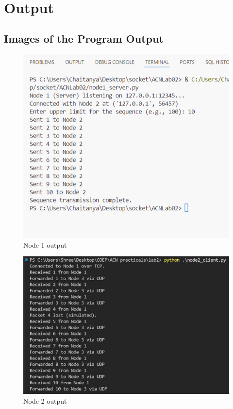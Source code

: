 \documentclass{article}
\begin{document}
\section{Output}


\subsection{Images of the Program Output}
\begin{figure}[htbp]
    \centering
    \includegraphics[]{node01.png}
    \caption{Node 1 output}
    \label{fig:node01}
\end{figure}

\begin{figure}[htbp]
    \centering
    \includegraphics[angle=90,width=14cm]{node02.png}
    \caption{Node 2 output}
    \label{fig:node02}
\end{figure}
\end{document}
